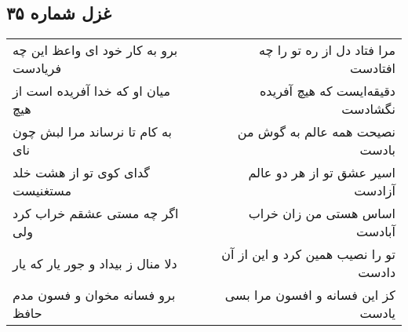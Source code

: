 \begin{center}
\section*{غزل شماره ۳۵}
\label{sec:sh035}
\begin{longtable}{l p{0.5cm} r}
برو به کار خود ای واعظ این چه فریادست
&&
مرا فتاد دل از ره تو را چه افتادست
\\
میان او که خدا آفریده است از هیچ
&&
دقیقه‌ایست که هیچ آفریده نگشادست
\\
به کام تا نرساند مرا لبش چون نای
&&
نصیحت همه عالم به گوش من بادست
\\
گدای کوی تو از هشت خلد مستغنیست
&&
اسیر عشق تو از هر دو عالم آزادست
\\
اگر چه مستی عشقم خراب کرد ولی
&&
اساس هستی من زان خراب آبادست
\\
دلا منال ز بیداد و جور یار که یار
&&
تو را نصیب همین کرد و این از آن دادست
\\
برو فسانه مخوان و فسون مدم حافظ
&&
کز این فسانه و افسون مرا بسی یادست
\\
\end{longtable}
\end{center}
